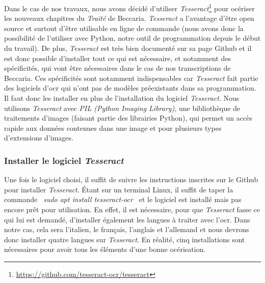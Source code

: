 Dans le cas de nos travaux, nous avons décidé d'utiliser \emph{Tesseract}{\footnote{\url{https://github.com/tesseract-ocr/tesseract}}} pour océriser les nouveaux chapitres du \textit{Traité} de Beccaria. \emph{Tesseract} a l'avantage d'être open source et surtout d'être utilisable en ligne de commande (nous avons donc la possibilité de l'utiliser avec Python, notre outil de programmation depuis le début du travail). De plus, \emph{Tesseract} est très bien documenté sur sa page Github et il est donc possible d'installer tout ce qui est nécessaire, et notamment des spécificités, qui vont être nécessaires dans le cas de nos transcriptions de Beccaria. Ces spécificités sont notamment indispensables car \emph{Tesseract} fait partie des logiciels d'\acrshort{ocr} qui n'ont pas de modèles préexistants dans sa programmation. Il faut donc les installer en plus de l'installation du logiciel \emph{Tesseract}. Nous utilisons \emph{Tesseract} avec \emph{PIL (Python Imaging Library)}, une bibliothèque de traitements d'images (faisant partie des librairies Python), qui permet un accès rapide aux données contenues dans une image et pour plusieurs types d'extensions d'images.

\subsubsection{Installer le logiciel \emph{Tesseract}}
Une fois le logiciel choisi, il suffit de suivre les instructions inscrites sur le Github pour installer \emph{Tesseract}. Étant sur un terminal Linux, il suffit de taper la commande \textit{\og~sudo apt install tesseract-ocr~\fg{}} et le logiciel est installé mais pas encore prêt pour utilisation. En effet, il est nécessaire, pour que \emph{Tesseract} fasse ce qui lui est demandé, d'installer également les langues à traiter avec l'\acrshort{ocr}. Dans notre cas, cela sera l'italien, le français, l'anglais et l'allemand et nous devrons donc installer quatre langues sur \emph{Tesseract}. En réalité, cinq installations sont nécessaires pour avoir tous les éléments d'une bonne océrisation.

